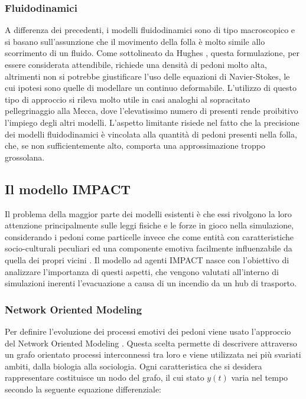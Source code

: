 \subsubsection{Fluidodinamici}
A differenza dei precedenti, i modelli fluidodinamici sono di tipo macroscopico e si basano sull'assunzione che il movimento della folla è molto simile allo scorrimento di un fluido. \newline
Come sottolineato da Hughes \cite{Hughes2002}, questa formulazione, per essere considerata attendibile, richiede una densità di pedoni molto alta, altrimenti non si potrebbe giustificare l'uso delle equazioni di Navier-Stokes, le cui ipotesi sono quelle di modellare un continuo deformabile. \newline
L'utilizzo di questo tipo di approccio si rileva molto utile in casi analoghi al sopracitato pellegrinaggio alla Mecca, dove l'elevatissimo numero di presenti rende proibitivo l'impiego degli altri modelli. \newline
L'aspetto limitante risiede nel fatto che la precisione dei modelli fluidodinamici è vincolata alla quantità di pedoni presenti nella folla, che, se non sufficientemente alto, comporta una approssimazione troppo grossolana.

\subsection{Il modello IMPACT}
Il problema della maggior parte dei modelli esistenti è che essi rivolgono la loro attenzione principalmente sulle leggi fisiche e le forze in gioco nella simulazione, considerando i pedoni come particelle invece che come entità con caratteristiche socio-culturali peculiari ed una componente emotiva facilmente influenzabile da quella dei propri vicini \cite{Zheng2009}. \newline
Il modello ad agenti IMPACT \cite{vanderWal2017Model} nasce con l’obiettivo di analizzare l'importanza di questi aspetti, che vengono valutati all'interno di simulazioni inerenti l'evacuazione a causa di un incendio da un hub di trasporto.

\subsubsection{Network Oriented Modeling}
Per definire l'evoluzione dei processi emotivi dei pedoni viene usato l'approccio del Network Oriented Modeling \cite{Treur2018}. Questa scelta permette di descrivere attraverso un grafo orientato processi interconnessi tra loro e viene utilizzata nei più svariati ambiti, dalla biologia alla sociologia. \newline 
Ogni caratteristica che si desidera rappresentare costituisce un nodo del grafo, il cui stato $y(t)$ varia nel tempo secondo la seguente equazione differenziale:

